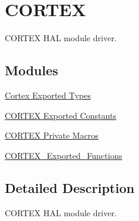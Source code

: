 \hypertarget{group___c_o_r_t_e_x}{}\section{C\+O\+R\+T\+EX}
\label{group___c_o_r_t_e_x}


C\+O\+R\+T\+EX H\+AL module driver.  


\subsection*{Modules}
\begin{DoxyCompactItemize}
\item 
\hyperlink{group___c_o_r_t_e_x___exported___types}{Cortex Exported Types}
\item 
\hyperlink{group___c_o_r_t_e_x___exported___constants}{C\+O\+R\+T\+E\+X Exported Constants}
\item 
\hyperlink{group___c_o_r_t_e_x___private___macros}{C\+O\+R\+T\+E\+X Private Macros}
\item 
\hyperlink{group___c_o_r_t_e_x___exported___functions}{C\+O\+R\+T\+E\+X\+\_\+\+Exported\+\_\+\+Functions}
\end{DoxyCompactItemize}


\subsection{Detailed Description}
C\+O\+R\+T\+EX H\+AL module driver. 

